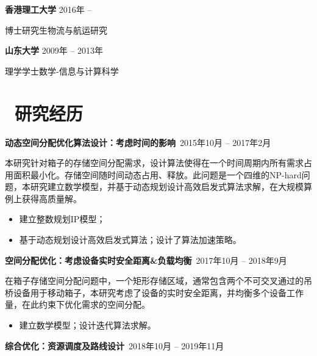 \documentclass[11pt]{article}
\begin{document}
\textbf{香港理工大学} \hfill 2016年 -- 

博士研究生\quad 物流与航运研究

\textbf{山东大学} \hfill 2009年 -- 2013年

理学学士\quad 数学-信息与计算科学


\section{\makebox[\widthof{\faGraduationCap}][c]{\color{CVBlue}\faLightbulbO}\ 研究经历}
\textbf{动态空间分配优化算法设计：考虑时间的影响}\  \hfill 2015年10月 -- 2017年2月

本研究针对箱子的存储空间分配需求，设计算法使得在一个时间周期内所有需求占用面积最小化。存储空间随时间动态占用、释放。此问题是一个四维的NP-hard问题，本研究建立数学模型，并基于动态规划设计高效启发式算法求解，在大规模算例上获得高质量解。

\begin{itemize}
  \item 建立整数规划IP模型；
  \item 基于动态规划设计高效启发式算法；设计了算法加速策略。
\end{itemize}

\textbf{空间分配优化：考虑设备实时安全距离\&负载均衡}\  \hfill 2017年10月 -- 2018年9月

在箱子存储空间分配问题中，一个矩形存储区域，通常包含两个不可交叉通过的吊桥设备用于移动箱子，本研究考虑了设备的实时安全距离，并均衡多个设备工作量，在此约束下优化需求的空间分配。
\begin{itemize}
  \item 建立数学模型；设计迭代算法求解。
\end{itemize}

\textbf{综合优化：资源调度及路线设计}\  \hfill 2018年10月 -- 2019年11月
\end{document}
